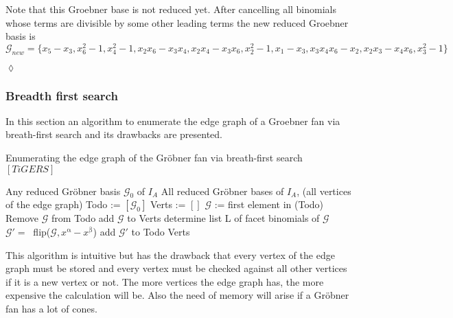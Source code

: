 \begin{env_example}
Note that this Groebner base is not reduced yet. After cancelling all binomials whose terms are divisible by some other leading terms the new reduced Groebner basis is 
$\mathcal{G}_{new} = \{x_{5}-x_{3},x_{6}^{2}-1,x_{4}^{2}-1,x_{2}x_{6}-x_{3}x_{4},x_{2}x_{4}-x_{3}x_{6},x_{2}^{2}-1,x_{1}-x_{3}, x_{3}x_{4}x_{6}-x_{2},x_{2}x_{3}-x_{4}x_{6},x_{3}^{2}-1 \} $

\begin{flushright}
$\lozenge$
\end{flushright}
\end{env_example}


\subsubsection{Breadth first search}

In this section an algorithm to enumerate the edge graph of a Groebner fan via breath-first search and its drawbacks are presented.

\begin{algorithm}
\caption{Enumerating the edge graph of the Gröbner fan via breath-first search $\left[ TiGERS\right]  $}
\label{alg:breath}
\begin{algorithmic}[1]

\Require
Any reduced Gröbner basis $ \mathcal{G}_0 $ of $I_A$
\Ensure All reduced Gröbner bases of $I_A$, (all vertices of the edge graph)
\State Todo := $\left[ \mathcal{G}_0 \right]  $
\State Verts := $\left[ \right] $
\State $\mathcal{G}$ := first element in (Todo)
\State Remove $\mathcal{G} $ from Todo
\State add $\mathcal{G}$ to Verts 
\State determine list L of facet binomials of $\mathcal{G} $
 \State $\mathcal{G}' =~$ flip($\mathcal{G},x^{\upalpha} - x^{\upbeta} $)
 \State add $\mathcal{G}'$ to Todo
 \EndIf
 \EndFor
\EndWhile 
\Return Verts

\end{algorithmic}
\end{algorithm}

This algorithm is intuitive but has the drawback that every vertex of the edge graph must be stored and every vertex must be checked against all other vertices if it is a new vertex or not. 
The more vertices the edge graph has, the more expensive the calculation will be. Also the need of memory will arise if a Gröbner fan has a lot of cones.
 

